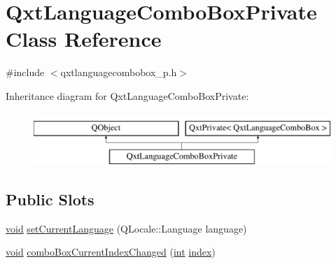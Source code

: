 \hypertarget{class_qxt_language_combo_box_private}{\section{Qxt\-Language\-Combo\-Box\-Private Class Reference}
\label{class_qxt_language_combo_box_private}
}


{\ttfamily \#include $<$qxtlanguagecombobox\-\_\-p.\-h$>$}

Inheritance diagram for Qxt\-Language\-Combo\-Box\-Private\-:\begin{figure}[H]
\begin{center}
\leavevmode
\includegraphics[height=2.000000cm]{class_qxt_language_combo_box_private}
\end{center}
\end{figure}
\subsection*{Public Slots}
\begin{DoxyCompactItemize}
\item 
\hyperlink{group___u_a_v_objects_plugin_ga444cf2ff3f0ecbe028adce838d373f5c}{void} \hyperlink{class_qxt_language_combo_box_private_a3605e1a5e480a69d67a1b3dc62f35c6c}{set\-Current\-Language} (Q\-Locale\-::\-Language language)
\item 
\hyperlink{group___u_a_v_objects_plugin_ga444cf2ff3f0ecbe028adce838d373f5c}{void} \hyperlink{class_qxt_language_combo_box_private_a6bbc369aa48ff241ce038f564dce59a4}{combo\-Box\-Current\-Index\-Changed} (\hyperlink{ioapi_8h_a787fa3cf048117ba7123753c1e74fcd6}{int} \hyperlink{glext_8h_ab47dd9958bcadea08866b42bf358e95e}{index})
\end{DoxyCompactItemize}
